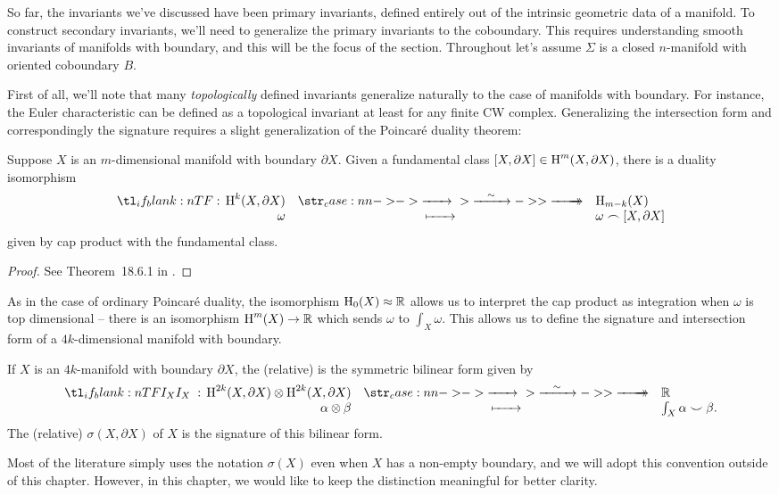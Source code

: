 So far, the invariants we've discussed have been primary invariants, defined entirely out of the intrinsic geometric data of a manifold. To construct secondary invariants,
we'll need to generalize the primary invariants to the coboundary. This requires understanding smooth invariants of manifolds with boundary, and this will be the focus of the section.
Throughout let's assume $\Sigma$ is a closed $n$-manifold with oriented coboundary $B$.

First of all, we'll note that many \emph{topologically} defined invariants generalize naturally to the case of manifolds with boundary. For instance, the Euler characteristic can be defined as a topological invariant at least for any finite CW complex. Generalizing the intersection form and correspondingly the signature requires a slight generalization of the Poincar\'e duality theorem:
\begin{theorem}
	Suppose $X$ is an $m$-dimensional manifold with boundary $\partial X$. Given a fundamental class $[X, \partial X]\in \operatorname{H}^{m}(X, \partial X)$, there is a duality isomorphism
	\[
		\lkxfunc{}{\H^k(X, \partial X)}{\H_{m-k}(X)}{\omega}{\omega\frown [X,\partial X]}
	\]
	given by cap product with the fundamental class.
\end{theorem}
\begin{proof}
	See Theorem~18.6.1 in \cite{dieck2008algebraic}.
\end{proof}
As in the case of ordinary Poincar\'e duality, the isomorphism $\operatorname{H}_0(X)\approx \mathbb{R}$ allows us to interpret the cap product as integration when $\omega$ is top dimensional -- there is an isomorphism $\operatorname{H}^m(X)\to \mathbb{R}$ which sends $\omega$ to $\int_X \omega$. This allows us to define the signature and intersection form of a $4k$-dimensional manifold with boundary.

\begin{definition}
	If $X$ is an $4k$-manifold with boundary $\partial X$, the (relative)  is the symmetric bilinear form given by
	\[
		\lkxfunc{I_{X}}{\H^{2k}(X, \partial X)\otimes \H^{2k}(X, \partial X)}
		{\R}{\alpha\otimes \beta}{\int_X \alpha\smile \beta.}
	\]
	The (relative)  $\sigma(X, \partial X)$ of $X$ is the signature of this bilinear form.
\end{definition}

\begin{convention*}
	Most of the literature simply uses the notation $\sigma(X)$ even when $X$ has a non-empty boundary, and we will adopt this convention outside of this chapter. However, in this chapter, we would like to keep the distinction meaningful for better clarity.
\end{convention*}

